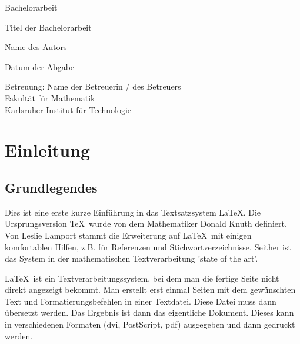 \documentclass[12pt,a4paper]{scrartcl}
\numberwithin{equation}{section}
\begin{document}
  \pagestyle{empty}

  \begin{titlepage}

    \vspace*{2cm} 

 \begin{center} \large 
    
    Bachelorarbeit
    \vspace*{2cm}

    {\huge Titel der Bachelorarbeit}
    \vspace*{2.5cm}

    Name des Autors
    \vspace*{1.5cm}

    Datum der Abgabe
    \vspace*{4.5cm}


    Betreuung: Name der Betreuerin / des Betreuers \\[1cm]
    Fakult\"at für Mathematik \\[1cm]
		Karlsruher Institut für Technologie
  \end{center}
\end{titlepage}


  \tableofcontents

\newpage

  \pagestyle{headings}

\section{Einleitung}

\subsection{Grundlegendes}



Dies ist eine erste kurze Einführung in das Textsatzsystem \LaTeX. 
Die Ursprungsversion \TeX\ wurde von dem Mathematiker Donald Knuth definiert.
Von Leslie Lamport stammt die Erweiterung auf \LaTeX\ mit einigen komfortablen Hilfen, z.B. für Referenzen und Stichwortverzeichnisse. Seither ist das System in der mathematischen Textverarbeitung 'state of the art'.

\LaTeX\ ist ein Textverarbeitungssystem, bei dem man die fertige Seite nicht direkt angezeigt bekommt. Man erstellt erst einmal Seiten mit dem gewünschten Text und Formatierungsbefehlen in einer Textdatei. Diese Datei muss dann übersetzt werden. Das Ergebnis ist dann das eigentliche Dokument. Dieses kann in verschiedenen Formaten (dvi, PostScript, pdf) ausgegeben und dann gedruckt werden. 
\end{document}
